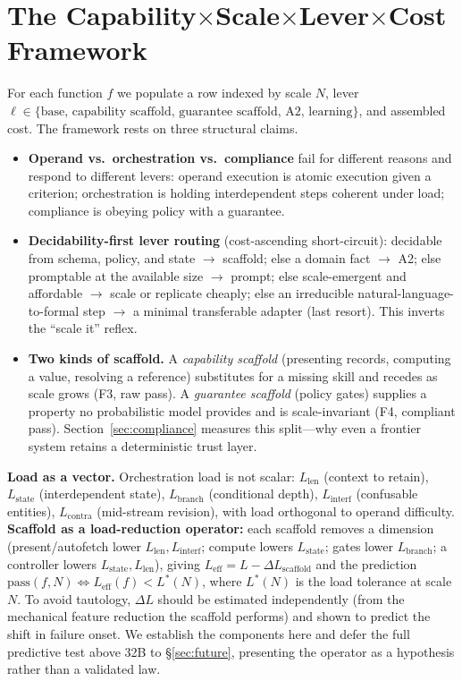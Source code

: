\documentclass[10pt]{article}
\begin{document}
\section{The Capability$\times$Scale$\times$Lever$\times$Cost Framework}\label{sec:framework}
For each function $f$ we populate a row indexed by scale $N$, lever $\ell \in \{\text{base, capability scaffold, guarantee scaffold, A2, learning}\}$, and assembled cost. The framework rests on three structural claims.
\begin{itemize}\itemsep1pt
\item \textbf{Operand vs.\ orchestration vs.\ compliance} fail for different reasons and respond to different levers: operand execution is atomic execution given a criterion; orchestration is holding interdependent steps coherent under load; compliance is obeying policy with a guarantee.
\item \textbf{Decidability-first lever routing} (cost-ascending short-circuit): decidable from schema, policy, and state $\to$ scaffold; else a domain fact $\to$ A2; else promptable at the available size $\to$ prompt; else scale-emergent and affordable $\to$ scale or replicate cheaply; else an irreducible natural-language-to-formal step $\to$ a minimal transferable adapter (last resort). This inverts the ``scale it'' reflex.
\item \textbf{Two kinds of scaffold.} A \emph{capability scaffold} (presenting records, computing a value, resolving a reference) substitutes for a missing skill and recedes as scale grows (F3, raw pass). A \emph{guarantee scaffold} (policy gates) supplies a property no probabilistic model provides and is scale-invariant (F4, compliant pass). Section~\ref{sec:compliance} measures this split---why even a frontier system retains a deterministic trust layer.
\end{itemize}
\textbf{Load as a vector.} Orchestration load is not scalar: $L_{\mathrm{len}}$ (context to retain), $L_{\mathrm{state}}$ (interdependent state), $L_{\mathrm{branch}}$ (conditional depth), $L_{\mathrm{interf}}$ (confusable entities), $L_{\mathrm{contra}}$ (mid-stream revision), with load orthogonal to operand difficulty. \textbf{Scaffold as a load-reduction operator:} each scaffold removes a dimension (present/autofetch lower $L_{\mathrm{len}},L_{\mathrm{interf}}$; compute lowers $L_{\mathrm{state}}$; gates lower $L_{\mathrm{branch}}$; a controller lowers $L_{\mathrm{state}},L_{\mathrm{len}}$), giving $L_{\mathrm{eff}} = L - \Delta L_{\mathrm{scaffold}}$ and the prediction $\mathrm{pass}(f,N) \Leftrightarrow L_{\mathrm{eff}}(f) < L^*(N)$, where $L^*(N)$ is the load tolerance at scale $N$. To avoid tautology, $\Delta L$ should be estimated independently (from the mechanical feature reduction the scaffold performs) and shown to predict the shift in failure onset. We establish the components here and defer the full predictive test above 32B to \S\ref{sec:future}, presenting the operator as a hypothesis rather than a validated law.
\end{document}
